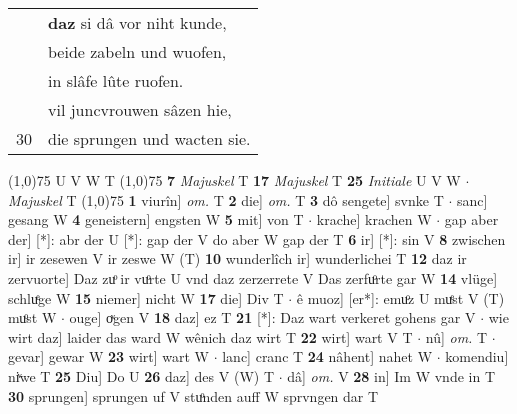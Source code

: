 \documentclass[8pt,a4paper,notitlepage]{article}
\begin{document}
\begin{table}[ht]
\begin{minipage}[t]{0.5\linewidth}
\begin{tabular}{rl}
 & \textbf{daz} si dâ vor niht kunde,\\ 
 & beide zabeln und wuofen,\\ 
 & in slâfe lûte ruofen.\\ 
 & vil juncvrouwen sâzen hie,\\ 
30 & die sprungen und wacten sie.\\ 
\end{tabular}
\scriptsize
\line(1,0){75} \newline
U V W T \newline
\line(1,0){75} \newline
\textbf{7} \textit{Majuskel} T  \textbf{17} \textit{Majuskel} T  \textbf{25} \textit{Initiale} U V W   $\cdot$ \textit{Majuskel} T  \newline
\line(1,0){75} \newline
\textbf{1} viurîn] \textit{om.} T \textbf{2} die] \textit{om.} T \textbf{3} dô sengete] svnke T  $\cdot$ sanc] gesang W \textbf{4} geneistern] engsten W \textbf{5} mit] von T  $\cdot$ krache] krachen W  $\cdot$ gap aber der] [*]: abr der U [*]: gap der V do aber W gap der T \textbf{6} ir] [*]: sin V \textbf{8} zwischen ir] ir zesewen V ir zeswe W (T) \textbf{10} wunderlîch ir] wunderlichei T \textbf{12} daz ir zervuorte] Daz zuͦ ir vuͦrte U vnd daz zerzerrete V Das zerfuͦrte gar W \textbf{14} vlüge] schluͤge W \textbf{15} niemer] nicht W \textbf{17} die] Div T  $\cdot$ ê muoz] [er*]: emuͦz U muͤst V (T) muͦst W  $\cdot$ ouge] oͮgen V \textbf{18} daz] ez T \textbf{21} [*]: Daz wart verkeret gohens gar V  $\cdot$ wie wirt daz] laider das ward W wênich daz wirt T \textbf{22} wirt] wart V T  $\cdot$ nû] \textit{om.} T  $\cdot$ gevar] gewar W \textbf{23} wirt] wart W  $\cdot$ lanc] cranc T \textbf{24} nâhent] nahet W  $\cdot$ komendiu] niͮwe T \textbf{25} Diu] Do U \textbf{26} daz] des V (W) T  $\cdot$ dâ] \textit{om.} V \textbf{28} in] Im W vnde in T \textbf{30} sprungen] sprungen uf V stuͦnden auff W sprvngen dar T \newline
\end{minipage}
\end{table}
\end{document}
